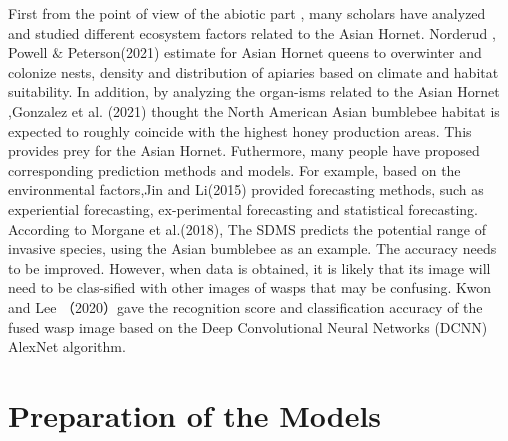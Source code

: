 \documentclass{mcmthesis}
\begin{document}
First from the point of view of the abiotic part , many scholars have analyzed and studied different ecosystem factors related to the Asian Hornet. Norderud , Powell $ \& $ Peterson(2021) estimate for Asian Hornet queens to overwinter and colonize nests, density and distribution of apiaries based on climate and habitat suitability. In addition, by analyzing the organ-isms related to the Asian Hornet ,Gonzalez et al. (2021) thought the North American Asian bumblebee habitat is expected to roughly coincide with the highest honey production areas. This provides prey for the Asian Hornet. Futhermore, many people have proposed corresponding prediction methods and models. For example, based on the environmental factors,Jin and Li(2015) provided forecasting methods, such as experiential forecasting, ex-perimental forecasting and statistical forecasting. According to Morgane et al.(2018), The SDMS predicts the potential range of invasive species, using the Asian bumblebee as an example. The accuracy needs to be improved. However, when data is obtained, it is likely that its image will need to be clas-sified with other images of wasps that may be confusing. Kwon and Lee （2020）gave the recognition score and classification accuracy of the fused wasp image based on the Deep Convolutional Neural Networks (DCNN) AlexNet algorithm.

\hspace*{\fill}
\section{Preparation of the Models}
\end{document}
